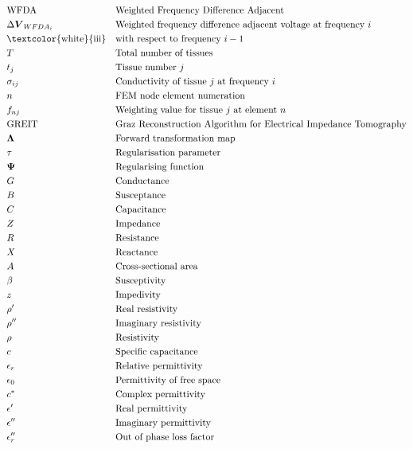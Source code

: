 \pagebreak
\begin{align*}
	&\text{WFDA} &&\text{Weighted Frequency Difference Adjacent}\\
	&\Delta \boldsymbol{V}_{WFDA_i} &&\text{Weighted frequency difference adjacent voltage at frequency } i \\
	&\text{\textcolor{white}{iii}} &&\text{with respect to frequency } i - 1 \\
	&T &&\text{Total number of tissues}\\
	&t_j &&\text{Tissue number } j \\
	&\sigma_{ij} &&\text{Conductivity of tissue } j \text{ at frequency } i \\
	&n &&\text{FEM node element numeration}\\
	&f_{nj} &&\text{Weighting value for tissue } j \text{ at element } n \\
	&\text{GREIT} &&\text{Graz Reconstruction Algorithm for Electrical Impedance Tomography}\\
	&\boldsymbol{\Lambda} &&\text{Forward transformation map}\\
	&\tau &&\text{Regularisation parameter}\\
	&\boldsymbol{\Psi} &&\text{Regularising function}\\
	&G &&\text{Conductance}\\
	&B &&\text{Susceptance}\\
	&C &&\text{Capacitance}\\
	&Z &&\text{Impedance}\\
	&R &&\text{Resistance}\\
	&X &&\text{Reactance}\\
	&A &&\text{Cross-sectional area}\\
	&\beta &&\text{Susceptivity}\\
	&z &&\text{Impedivity}\\
	&\rho' &&\text{Real resistivity}\\
	&\rho'' &&\text{Imaginary resistivity}\\
	&\rho &&\text{Resistivity}\\
	&c &&\text{Specific capacitance}\\
	&\epsilon_r &&\text{Relative permittivity}\\
	&\epsilon_0 &&\text{Permittivity of free space}\\
	&c^* &&\text{Complex permittivity}\\
	&\epsilon' &&\text{Real permittivity}\\
	&\epsilon'' &&\text{Imaginary permittivity}\\
	&\epsilon_r'' &&\text{Out of phase loss factor}\\
\end{align*}

